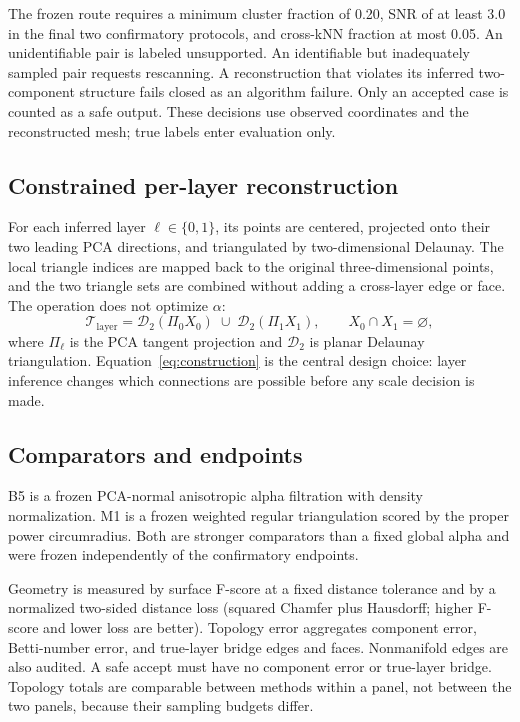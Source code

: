 \documentclass[12pt,a4paper]{article}
\begin{document}
The frozen route requires a minimum cluster fraction of 0.20, SNR of at least
3.0 in the final two confirmatory protocols, and cross-kNN fraction at most 0.05.
An unidentifiable pair is labeled unsupported. An identifiable but inadequately
sampled pair requests rescanning. A reconstruction that violates its inferred
two-component structure fails closed as an algorithm failure. Only an accepted
case is counted as a safe output. These decisions use observed coordinates and
the reconstructed mesh; true labels enter evaluation only.

\subsection{Constrained per-layer reconstruction}

For each inferred layer $\ell\in\{0,1\}$, its points are centered, projected onto
their two leading PCA directions, and triangulated by two-dimensional Delaunay.
The local triangle indices are mapped back to the original three-dimensional
points, and the two triangle sets are combined without adding a cross-layer edge
or face. The operation does not optimize $\alpha$:
\begin{equation}
 \mathcal{T}_{\mathrm{layer}}
 =\mathcal{D}_{2}\!\left(\Pi_0 X_0\right)
  \;\cup\;
  \mathcal{D}_{2}\!\left(\Pi_1 X_1\right),
 \qquad X_0\cap X_1=\varnothing,
 \label{eq:construction}
\end{equation}
where $\Pi_\ell$ is the PCA tangent projection and $\mathcal{D}_2$ is planar
Delaunay triangulation. Equation~\eqref{eq:construction} is the central design
choice: layer inference changes which connections are possible before any scale
decision is made.

\subsection{Comparators and endpoints}

B5 is a frozen PCA-normal anisotropic alpha filtration with density
normalization. M1 is a frozen weighted regular triangulation scored by the proper
power circumradius. Both are stronger comparators than a fixed global alpha and
were frozen independently of the confirmatory endpoints.

Geometry is measured by surface F-score at a fixed distance tolerance and by a
normalized two-sided distance loss (squared Chamfer plus Hausdorff; higher
F-score and lower loss are better). Topology error aggregates component error,
Betti-number error, and true-layer bridge edges and faces. Nonmanifold edges are
also audited. A safe accept must have no component error or true-layer bridge.
Topology totals are comparable between methods within a panel, not between the
two panels, because their sampling budgets differ.
\end{document}
